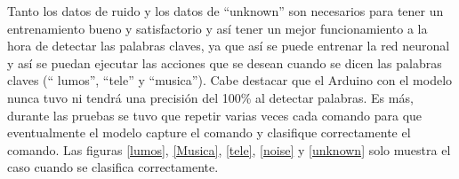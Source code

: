 Tanto los datos de ruido y los datos de ``unknown'' son necesarios para tener un entrenamiento bueno y satisfactorio y así tener un mejor funcionamiento a la hora de detectar las palabras claves, ya que así se puede entrenar la red neuronal y así se puedan ejecutar las acciones que se desean cuando se dicen las palabras claves (`` lumos'', ``tele'' y ``musica''). Cabe destacar que el Arduino con el modelo nunca tuvo ni tendrá una precisión del 100\% al detectar palabras. Es más, durante las pruebas se tuvo que repetir varias veces cada comando para que eventualmente el modelo capture el comando y clasifique correctamente el comando. Las figuras \ref{lumos}, \ref{Musica}, \ref{tele}, \ref{noise} y \ref{unknown} solo muestra el caso cuando se clasifica correctamente. 





































